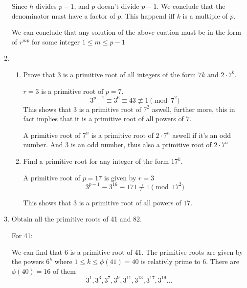 \documentclass[12pt]{exam}
\theoremstyle{definition}
\begin{document}
\begin{enumerate}
\begin{answer}
            Since $h$ divides $p-1$, and $p$ doesn't divide $p-1$. We conclude that the denominator must have a factor of $p$.
            This happend iff $k$ is a multiple of $p$.

            We can conclude that any solution of the above euation must be in the form of $r^{mp}$ for some integer $1 \leq m \leq p-1$
      \end{answer}

      \item \begin{enumerate}
            \item Prove that $3$ is a primitive root of all integers of the form $7k$ and $2 \cdot 7^k$.
            \begin{answer}
                  $r = 3$ is a primitive root of $p = 7$.
                  \[
                        3^{p-1} \equiv 3^6 \equiv 43 \not\equiv 1 \pmod{7^2}
                  \]
                  This shows that $3$ is a primitive root of $7^2$ aswell, further more, this in fact implies that 
                  it is a primitive root of all powers of $7$.

                  A primitive root of $7^n$ is a primitive root of $2\cdot7^n$ aswell if it's an odd number. And $3$ is an odd
                  number, thus also a primitive root of $2\cdot7^n$
            \end{answer}
            \item Find a primitive root for any integer of the form $17^k$.
            \begin{answer}
                  A primitive root of $p = 17$ is given by $r = 3$
                  \[
                        3^{p-1} \equiv 3^{16} \equiv 171 \not\equiv 1 \pmod {17^2}
                  \]

                  This shows that $3$ is a primitive root of all powers of $17$.
            \end{answer}
      \end{enumerate}

      \item Obtain all the primitive roots of 41 and 82. 
      \begin{answer}
            For 41:

            We can find that 6 is a primitive root of 41. The primitive roots are given by the powers $6^k$ where $1 \leq k \leq \phi(41) = 40$ is
            relativly prime to 6. There are $\phi(40) = 16$ of them
            \[
                  3^{1}, 3^{3}, 3^{7}, 3^{9}, 3^{11}, 3^{13}, 3^{17}, 3^{19} \dots
            \]


\end{answer}
\end{enumerate}
\end{document}
